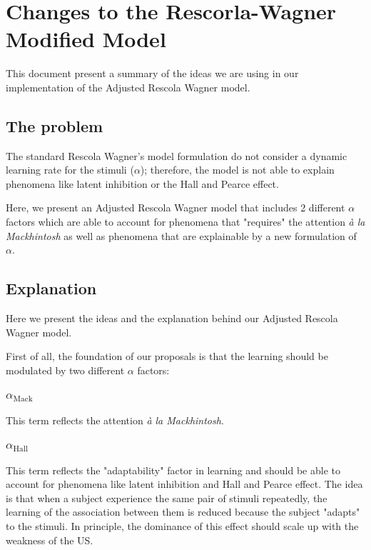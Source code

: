 \documentclass[11pt,a4paper]{article}
\newcommand{\alphamack}{\alpha _{\text{Mack}}}
\newcommand{\alphahall}{\alpha _{\text{Hall}}}
\begin{document}
\section*{Changes to the Rescorla-Wagner Modified Model}
This document present a summary of the ideas we are using in our implementation of the Adjusted Rescola Wagner model.

\subsection{The problem}
The standard Rescola Wagner's model formulation do not consider a dynamic learning rate for the stimuli ($\alpha$); therefore, the model is not able to explain phenomena like latent inhibition or the Hall and Pearce effect.

Here, we present an Adjusted Rescola Wagner model that includes 2 different $\alpha$ factors which are able to account for phenomena that "requires" the attention \textit{à la Mackhintosh} as well as phenomena that are explainable by a new formulation of $\alpha$.

\subsection{Explanation}
Here we present the ideas and the explanation behind our Adjusted Rescola Wagner model. 

First of all, the foundation of our proposals is that the learning should be modulated by two different $\alpha$ factors:

\subsubsection{$\alphamack$}
This term reflects the attention \textit{à la Mackhintosh}.

\subsubsection{$\alphahall$}
This term reflects the "adaptability" factor in learning and should be able to account for phenomena like latent inhibition and Hall and Pearce effect. The idea is that when a subject experience the same pair of stimuli repeatedly, the learning of the association between them is reduced because the subject "adapts" to the stimuli. In principle, the dominance of this effect should scale up with the weakness of the US.  
\end{document}
